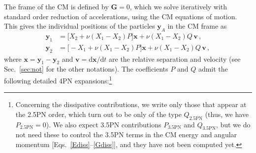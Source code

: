 \documentclass[prd,preprint,superscriptaddress,tightenlines,nofootinbib,
  eqsecnum,showpacs]{revtex4}
\newcommand{\ud}{\mathrm{d}}
\begin{document}
The frame of the CM is defined by $\bm{G}=0$, which we solve iteratively with
standard order reduction of accelerations, using the CM equations of motion. This
gives the individual positions of the particles $\bm{y}_A$ in the CM frame as
%
\begin{subequations}\label{y1y2}
\begin{align}
\bm{y}_1 &= \Big[X_2+\nu (X_1-X_2) P\Big] \bm{x} +\nu
(X_1-X_2)Q\,\bm{v} \,,\\ \bm{y}_2 &= \Big[-X_1+\nu (X_1-X_2)
  P\Big] \bm{x} +\nu (X_1-X_2) Q\,\bm{v} \,,
\end{align}
\end{subequations}
%
where $\bm{x}=\bm{y}_1-\bm{y}_2$ and $\bm{v}=\ud\bm{x}/\ud t$ are the relative
separation and velocity (see Sec.~\ref{sec:not} for the other notations). The
coefficients $P$ and $Q$ admit the following detailed 4PN
expansions:\footnote{Concerning the dissipative contributions, we write only
  those that appear at the 2.5PN order, which turn out to be only of the type
  $Q_\text{2.5PN}$ (thus, we have $P_\text{2.5PN}=0$). We also expect 3.5PN contributions $P_\text{3.5PN}$ and
  $Q_\text{3.5PN}$, but we do not need these to control the 3.5PN terms in the CM energy and angular momentum [Eqs.~\eqref{Ediss}--\eqref{Gdiss}], and they have not been computed yet.}
%
\end{document}

